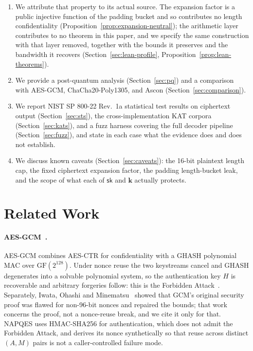 \documentclass[11pt,a4paper]{article}
\begin{document}
\begin{enumerate}
        (Corollary~\ref{cor:length-leak}), and exhibit the zero-query
        adversary that achieves maximal advantage against AES-GCM and
        ChaCha20-Poly1305 in the same game
        (Proposition~\ref{prop:lh-separation}).
  \item We attribute that property to its actual source. The expansion
        factor is a public injective function of the padding bucket and so
        contributes no length confidentiality
        (Proposition~\ref{prop:expansion-neutral}); the arithmetic layer
        contributes to no theorem in this paper, and we specify the same
        construction with that layer removed, together with the bounds it
        preserves and the bandwidth it recovers
        (Section~\ref{sec:lean-profile},
        Proposition~\ref{prop:lean-theorems}).
  \item We provide a post-quantum analysis (Section~\ref{sec:pq}) and a
        comparison with AES-GCM, ChaCha20-Poly1305, and Ascon
        (Section~\ref{sec:comparison}).
  \item We report NIST SP 800-22 Rev.\ 1a statistical test results on
        ciphertext output (Section~\ref{sec:sts}), the cross-implementation
        KAT corpora
        (Section~\ref{sec:kats}), and a fuzz harness covering the full
        decoder pipeline (Section~\ref{sec:fuzz}), and state in each case
        what the evidence does and does not establish.
  \item We discuss known caveats (Section~\ref{sec:caveats}): the 16-bit
        plaintext length cap, the fixed ciphertext expansion factor, the
        padding length-bucket leak, and the scope of what each of
        $\mathsf{sk}$ and $\mathbf{k}$ actually protects.
\end{enumerate}

\section{Related Work}
\label{sec:related}

\paragraph{AES-GCM~\cite{nist-gcm}.}
AES-GCM combines AES-CTR for confidentiality with a GHASH polynomial MAC
over $\mathrm{GF}(2^{128})$. Under nonce reuse the two keystreams cancel
and GHASH degenerates into a solvable polynomial system, so the
authentication key $H$ is recoverable and arbitrary forgeries follow: this
is the Forbidden Attack~\cite{joux2006}. Separately, Iwata, Ohashi and
Minematsu~\cite{iwata2012} showed that GCM's original security proof was
flawed for non-96-bit nonces and repaired the bounds; that work concerns
the proof, not a nonce-reuse break, and we cite it only for that. NAPQES
uses HMAC-SHA256 for authentication, which does not admit the Forbidden
Attack, and derives its nonce synthetically so that reuse across distinct
$(A,M)$ pairs is not a caller-controlled failure mode.
\end{document}
